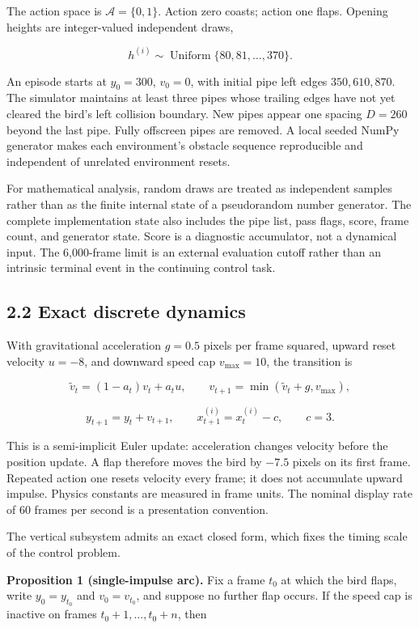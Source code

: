 \documentclass[
  11pt,
]{article}
\begin{document}
The action space is \(\mathcal A=\{0,1\}\). Action zero coasts; action
one flaps. Opening heights are integer-valued independent draws,

\[
h^{(i)}\sim\operatorname{Uniform}\{80,81,\ldots,370\}.
\]

An episode starts at \(y_0=300\), \(v_0=0\), with initial pipe left
edges \(350,610,870\). The simulator maintains at least three pipes
whose trailing edges have not yet cleared the bird's left collision
boundary. New pipes appear one spacing \(D=260\) beyond the last pipe.
Fully offscreen pipes are removed. A local seeded NumPy generator makes
each environment's obstacle sequence reproducible and independent of
unrelated environment resets.

For mathematical analysis, random draws are treated as independent
samples rather than as the finite internal state of a pseudorandom
number generator. The complete implementation state also includes the
pipe list, pass flags, score, frame count, and generator state. Score is
a diagnostic accumulator, not a dynamical input. The 6,000-frame limit
is an external evaluation cutoff rather than an intrinsic terminal event
in the continuing control task.

\subsection{2.2 Exact discrete dynamics}\label{exact-discrete-dynamics}

With gravitational acceleration \(g=0.5\) pixels per frame squared,
upward reset velocity \(u=-8\), and downward speed cap \(v_{\max}=10\),
the transition is

\[
\widetilde v_t=(1-a_t)v_t+a_tu,
\qquad
v_{t+1}=\min(\widetilde v_t+g,v_{\max}),
\]

\[
y_{t+1}=y_t+v_{t+1},
\qquad
x_{t+1}^{(i)}=x_t^{(i)}-c,
\qquad c=3.
\]

This is a semi-implicit Euler update: acceleration changes velocity
before the position update. A flap therefore moves the bird by \(-7.5\)
pixels on its first frame. Repeated action one resets velocity every
frame; it does not accumulate upward impulse. Physics constants are
measured in frame units. The nominal display rate of 60 frames per
second is a presentation convention.

The vertical subsystem admits an exact closed form, which fixes the
timing scale of the control problem.

\textbf{Proposition 1 (single-impulse arc).} Fix a frame \(t_0\) at
which the bird flaps, write \(y_0=y_{t_0}\) and \(v_0=v_{t_0}\), and
suppose no further flap occurs. If the speed cap is inactive on frames
\(t_0+1,\ldots,t_0+n\), then
\end{document}
